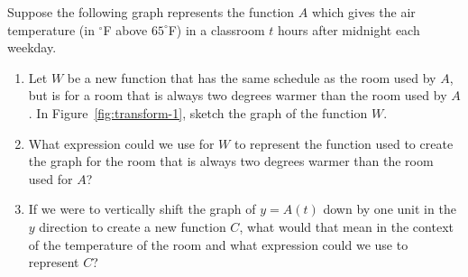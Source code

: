 \begin{myPrep}
Suppose the following graph represents the function $A$ which gives the air temperature (in $^\circ$F above $65^\circ$F) in a classroom $t$ hours after midnight each weekday.
\begin{center}
		\label{fig:transform-1}
	\end{center}
	\begin{enumerate}
		\item Let $W$ be a new function that has the same schedule as the room used by $A$, but is for a room that is always two degrees warmer than the room used by $A$.	  In Figure~\ref{fig:transform-1}, sketch the graph of the function $W$.
		\vfill
		\item What expression could we use for $W$ to represent the function used to create the graph for the room that is always two degrees warmer than the room used for $A$?
		\vfill
		\item If we were to vertically shift the graph of $y=A(t)$ down by one unit in the $y$ direction to create a new function $C$, what would that mean in the context of the temperature of the room and what expression could we use to represent $C$?
		\vfill
	\end{enumerate}
\end{myPrep}

